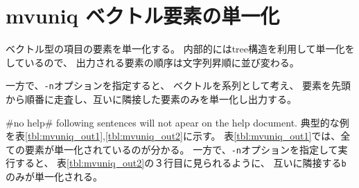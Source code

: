
%

\section{mvuniq ベクトル要素の単一化\label{sect:mvuniq}}

ベクトル型の項目の要素を単一化する。
内部的にはtree構造を利用して単一化をしているので、
出力される要素の順序は文字列昇順に並び変わる。

一方で、\verb|-n|オプションを指定すると、
ベクトルを系列として考え、
要素を先頭から順番に走査し、互いに隣接した要素のみを単一化し出力する。

 #no help# following sentences will not apear on the help document. \fi
典型的な例を表\ref{tbl:mvuniq_out1},\ref{tbl:mvuniq_out2}に示す。
表\ref{tbl:mvuniq_out1}では、全ての要素が単一化されているのが分かる。
一方で、\verb|-n|オプションを指定して実行すると、
表\ref{tbl:mvuniq_out2}の３行目に見られるように、
互いに隣接する\verb|b|のみが単一化される。

